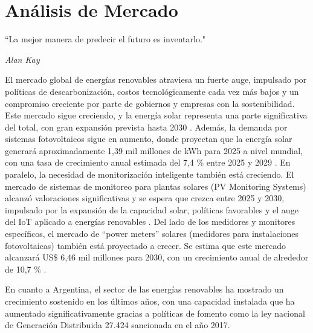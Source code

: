 \cleardoublepage                                  %
\chapter{Análisis de Mercado}
\epigraph{``La mejor manera de predecir el futuro es inventarlo."}{\textit{Alan Kay}}

El mercado global de energías renovables atraviesa un fuerte auge, impulsado por políticas de descarbonización, costos tecnológicamente cada vez más bajos y un compromiso creciente por parte de gobiernos y empresas con la sostenibilidad. Este mercado sigue creciendo, y la energía solar representa una parte significativa del total, con gran expansión prevista hasta 2030 \cite{mordor2025renewablemarket}. Además, la demanda por sistemas fotovoltaicos sigue en aumento, donde proyectan que la energía solar generará aproximadamente 1,39 mil millones de kWh para 2025 a nivel mundial, con una tasa de crecimiento anual estimada del 7,4 \% entre 2025 y 2029 \cite{statista2025solarenergy}.
En paralelo, la necesidad de monitorización inteligente también está creciendo. El mercado de sistemas de monitoreo para plantas solares (PV Monitoring Systems) alcanzó valoraciones significativas y se espera que crezca entre 2025 y 2030, impulsado por la expansión de la capacidad solar, políticas favorables y el auge del IoT aplicado a energías renovables \cite{globenewswire2025pvmonitoring}.
Del lado de los medidores y monitores específicos, el mercado de “power meters” solares (medidores para instalaciones fotovoltaicas) también está proyectado a crecer. Se estima que este mercado alcanzará US\$ 6,46 mil millones para 2030, con un crecimiento anual de alrededor de 10,7 \% \cite{grandview2025solarpowermeter}.

En cuanto a Argentina, el sector de las energías renovables ha mostrado un crecimiento sostenido en los últimos años, con una capacidad instalada que ha aumentado significativamente gracias a políticas de fomento como la ley nacional de Generación Distribuida 27.424 sancionada en el año 2017.%

